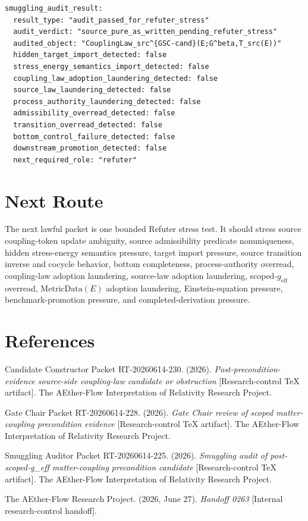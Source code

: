 \documentclass[11pt]{article}
\newcommand{\geff}{g_{\mathrm{eff}}}
\newcommand{\MetricData}{\mathrm{MetricData}}
\begin{document}
\begin{verbatim}
smuggling_audit_result:
  result_type: "audit_passed_for_refuter_stress"
  audit_verdict: "source_pure_as_written_pending_refuter_stress"
  audited_object: "CouplingLaw_src^{GSC-cand}(E;G^beta,T_src(E))"
  hidden_target_import_detected: false
  stress_energy_semantics_import_detected: false
  coupling_law_adoption_laundering_detected: false
  source_law_laundering_detected: false
  process_authority_laundering_detected: false
  admissibility_overread_detected: false
  transition_overread_detected: false
  bottom_control_failure_detected: false
  downstream_promotion_detected: false
  next_required_role: "refuter"
\end{verbatim}

\section{Next Route}

The next lawful packet is one bounded Refuter stress test. It should stress
source coupling-token update ambiguity, source admissibility predicate
nonuniqueness, hidden stress-energy semantics pressure, target import pressure,
source transition inverse and cocycle behavior, bottom completeness,
process-authority overread, coupling-law adoption laundering, source-law
adoption laundering, scoped-\(\geff\) overread, \(\MetricData(E)\) adoption
laundering, Einstein-equation pressure, benchmark-promotion pressure, and
completed-derivation pressure.

\section{References}

Candidate Constructor Packet RT-20260614-230. (2026). \textit{Post-precondition-evidence
source-side coupling-law candidate or obstruction} [Research-control TeX
artifact]. The AEther-Flow Interpretation of Relativity Research Project.

Gate Chair Packet RT-20260614-228. (2026). \textit{Gate Chair review of
scoped matter-coupling precondition evidence} [Research-control TeX artifact].
The AEther-Flow Interpretation of Relativity Research Project.

Smuggling Auditor Packet RT-20260614-225. (2026). \textit{Smuggling audit of
post-scoped-g\_eff matter-coupling precondition candidate} [Research-control
TeX artifact]. The AEther-Flow Interpretation of Relativity Research Project.

The AEther-Flow Research Project. (2026, June 27). \textit{Handoff 0263}
[Internal research-control handoff].
\end{document}
